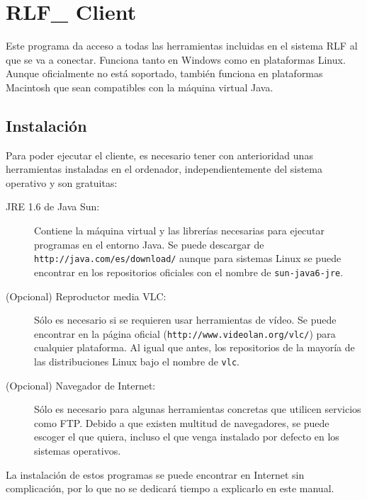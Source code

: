 

\section*{RLF\_ Client}
Este programa da acceso a todas las herramientas incluidas en el 
sistema RLF al que se va a conectar. Funciona tanto en Windows como en 
plataformas Linux. Aunque oficialmente no está soportado, también 
funciona en plataformas Macintosh que sean compatibles con la máquina 
virtual Java.

\subsection*{Instalación}
Para poder ejecutar el cliente, es necesario tener con anterioridad 
unas herramientas instaladas en el ordenador, independientemente del 
sistema operativo y son gratuitas:

\begin{description}
\item[JRE 1.6 de Java Sun:] Contiene la máquina virtual y las 
librerías necesarias para ejecutar programas en el entorno Java. Se 
puede descargar de \texttt{http://java.com/es/download/} aunque para 
sistemas Linux se puede encontrar en los repositorios oficiales con el 
nombre de \texttt{sun-java6-jre}.
\item[(Opcional) Reproductor media VLC:] Sólo es necesario si se 
requieren usar herramientas de vídeo. Se puede encontrar en la página 
oficial (\texttt{http://www.videolan.org/vlc/}) para cualquier 
plataforma. Al igual que antes, los repositorios de la mayoría de las 
distribuciones Linux bajo el nombre de \texttt{vlc}.
\item[(Opcional) Navegador de Internet:] Sólo es necesario para 
algunas herramientas concretas que utilicen servicios como FTP. Debido 
a que existen multitud de navegadores, se puede escoger el que 
quiera, incluso el que venga instalado por defecto en los sistemas 
operativos.
\end{description}

La instalación de estos programas se puede encontrar en Internet sin 
complicación, por lo que no se dedicará tiempo a explicarlo en este 
manual.

